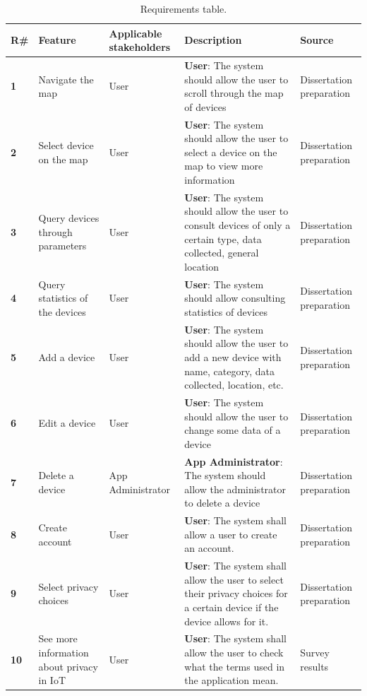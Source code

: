 \begin{table}[H]
    \centering
    \begin{adjustbox}{width=1\textwidth,center=\textwidth}
    \begin{tabular}{|l|p{}|p{}|p{}|p{}|}
        \hline
        \rowcolor{blue!5}
        \textbf{R\#} & \textbf{Feature} & \textbf{Applicable stakeholders} & \textbf{Description} & \textbf{Source} \\
        \hline
        \textbf{1} & Navigate the map & User & \textbf{User}: The system should allow the user to scroll through the map of devices & Dissertation preparation \\
        \hline
        \textbf{2} & Select device on the map & User & \textbf{User}: The system should allow the user to select a device on the map to view more information & Dissertation preparation \\
        \hline
        \textbf{3} & Query devices through parameters & User & \textbf{User}: The system should allow the user to consult devices of only a certain type, data collected, general location & Dissertation preparation \\
        \hline
        \textbf{4} & Query statistics of the devices & User & \textbf{User}: The system should allow consulting statistics of devices & Dissertation preparation \\
        \hline
        \textbf{5} & Add a device & User & \textbf{User}: The system should allow the user to add a new device with name, category, data collected, location, etc. & Dissertation preparation \\
        \hline
        \textbf{6} & Edit a device & User & \textbf{User}: The system should allow the user to change some data of a device & Dissertation preparation \\
        \hline
        \textbf{7} & Delete a device & App Administrator & \textbf{App Administrator}: The system should allow the administrator to delete a device & Dissertation preparation \\
        \hline
        \textbf{8} & Create account & User & \textbf{User}: The system shall allow a user to create an account. & Dissertation preparation \\
        \hline
        \textbf{9} & Select privacy choices & User & \textbf{User}: The system shall allow the user to select their privacy choices for a certain device if the device allows for it. & Dissertation preparation \\
        \hline
        \textbf{10} & See more information about privacy in IoT & User & \textbf{User}: The system shall allow the user to check what the terms used in the application mean. & Survey results \\
        \hline
    \end{tabular}
    \end{adjustbox}
    \vspace{1em}
    \caption{Requirements table.}
    \label{table:table1}
\end{table}

